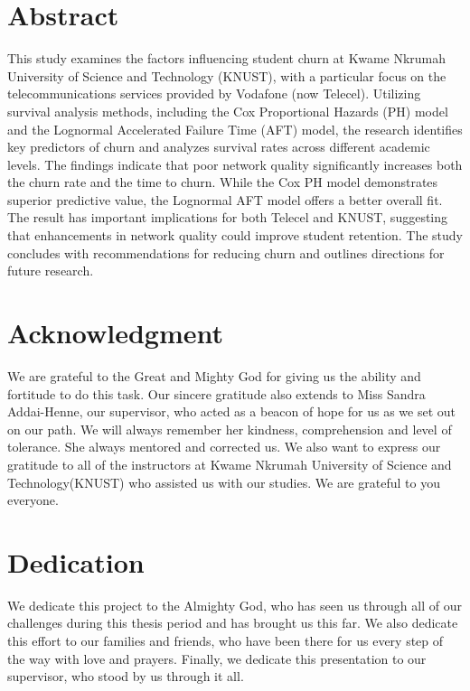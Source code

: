 \documentclass[doublespacing,12pt]{report}
\begin{document}
\newpage
\chapter*{Abstract}

This study examines the factors influencing student churn at Kwame Nkrumah University of Science and Technology (KNUST), with a particular focus on the telecommunications services provided by Vodafone (now Telecel). Utilizing survival analysis methods, including the Cox Proportional Hazards (PH) model and the Lognormal Accelerated Failure Time (AFT) model, the research identifies key predictors of churn and analyzes survival rates across different academic levels. The findings indicate that poor network quality significantly increases both the churn rate and the time to churn. While the Cox PH model demonstrates superior predictive value, the Lognormal AFT model offers a better overall fit. The result has important implications for both Telecel and KNUST, suggesting that enhancements in network quality could improve student retention. The study concludes with recommendations for reducing churn and outlines directions for future research.


\newpage
\chapter*{Acknowledgment}

We are grateful to the Great and Mighty God for giving us the ability and fortitude to do this task. Our sincere gratitude also extends to Miss Sandra Addai-Henne, our supervisor, who acted as a beacon of hope for us as we set out on our path. We will always remember her kindness, comprehension and level of tolerance. She always mentored and corrected us. We also want to express our gratitude to all of the instructors at Kwame Nkrumah University of Science and Technology(KNUST) who assisted us with our studies. We are grateful to you everyone.  



\newpage
\chapter*{Dedication}


We dedicate this project to the Almighty God, who has seen us through all of our challenges during this thesis period and has brought us this far. We also dedicate this effort to our families and friends, who have been there for us every step of the way with love and prayers. Finally, we dedicate this presentation to our supervisor, who stood by us through it all.  
\end{document}
